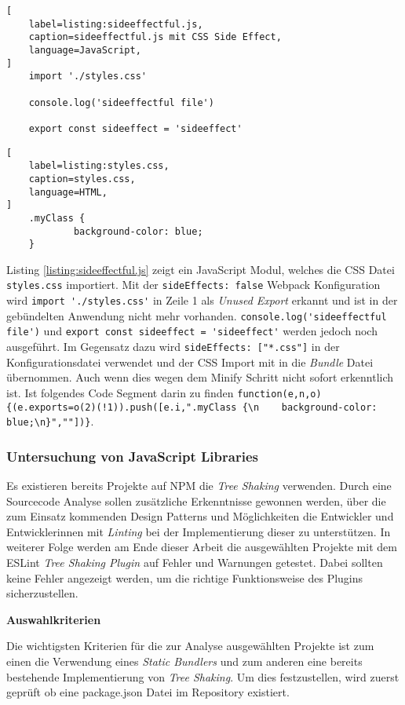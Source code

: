 \begin{lstlisting}[
    label=listing:sideeffectful.js,
	caption=sideeffectful.js mit CSS Side Effect,
	language=JavaScript,
]
	import './styles.css'

	console.log('sideeffectful file')

	export const sideeffect = 'sideeffect'
\end{lstlisting}

\begin{lstlisting}[
    label=listing:styles.css,
	caption=styles.css,
	language=HTML,
]
	.myClass {
    		background-color: blue;
	}
\end{lstlisting}

Listing \ref{listing:sideeffectful.js} zeigt ein JavaScript Modul, welches die CSS Datei \lstinline{styles.css} importiert. Mit der \lstinline{sideEffects: false} Webpack Konfiguration wird \lstinline{import './styles.css'} in Zeile 1 als \textit{Unused Export} erkannt und ist in der gebündelten Anwendung nicht mehr vorhanden. \lstinline{console.log('sideeffectful file')} und \lstinline{export const sideeffect = 'sideeffect'} werden jedoch noch ausgeführt.
Im Gegensatz dazu wird \lstinline{sideEffects: ["*.css"]} in der Konfigurationsdatei verwendet und der CSS Import mit in die \textit{Bundle} Datei übernommen. Auch wenn dies wegen dem Minify Schritt nicht sofort erkenntlich ist. Ist folgendes Code Segment darin zu finden \lstinline|function(e,n,o){(e.exports=o(2)(!1)).push([e.i,".myClass {\n    background-color: blue;\n}",""])}|.\autocite{WebpackTreeShaking}

\subsubsection{Untersuchung von JavaScript Libraries}
\label{subsubsection:untersuchung_von_js_libs}
Es existieren bereits Projekte auf NPM die \textit{Tree Shaking} verwenden. Durch eine Sourcecode Analyse sollen zusätzliche Erkenntnisse gewonnen werden, über die zum Einsatz kommenden Design Patterns und Möglichkeiten die Entwickler und Entwicklerinnen mit \textit{Linting} bei der Implementierung dieser zu unterstützen.
In weiterer Folge werden am Ende dieser Arbeit die ausgewählten Projekte mit dem ESLint \textit{Tree Shaking Plugin} auf Fehler und Warnungen getestet. Dabei sollten keine Fehler angezeigt werden, um die richtige Funktionsweise des Plugins sicherzustellen.

\textbf{Auswahlkriterien}

Die wichtigsten Kriterien für die zur Analyse ausgewählten Projekte ist zum einen die Verwendung eines \textit{Static Bundlers} und zum anderen eine bereits bestehende Implementierung von \textit{Tree Shaking}. Um dies festzustellen, wird zuerst geprüft ob eine package.json Datei im Repository existiert.

